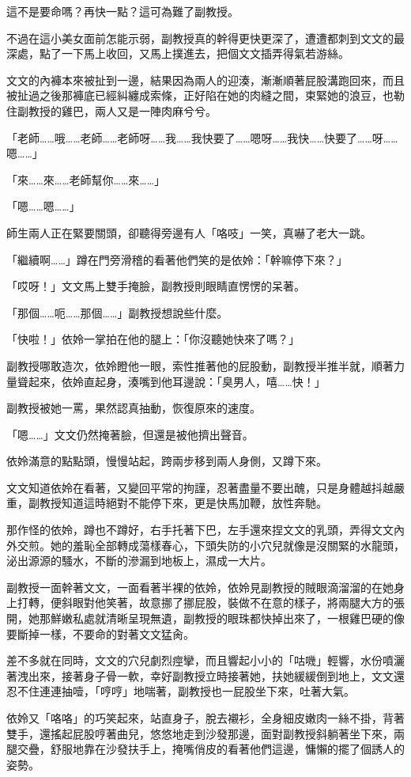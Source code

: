 這不是要命嗎？再快一點？這可為難了副教授。

不過在這小美女面前怎能示弱，副教授真的幹得更快更深了，遭遭都刺到文文的最深處，點了一下馬上收回，又馬上撲進去，把個文文插弄得氣若游絲。

文文的內褲本來被扯到一邊，結果因為兩人的迎湊，漸漸順著屁股溝跑回來，而且被扯過之後那褲底已經糾纏成索條，正好陷在她的肉縫之間，束緊她的浪豆，也勒住副教授的雞巴，兩人又是一陣肉麻兮兮。

「老師……哦……老師……老師呀……我……我快要了……嗯呀……我快……快要了……呀……嗯……」

「來……來……老師幫你……來……」

「嗯……嗯……」

師生兩人正在緊要關頭，卻聽得旁邊有人「咯吱」一笑，真嚇了老大一跳。

「繼續啊……」蹲在門旁滑稽的看著他們笑的是依姈：「幹嘛停下來？」

「哎呀！」文文馬上雙手掩臉，副教授則眼睛直愣愣的呆著。

「那個……呃……那個……」副教授想說些什麼。

「快啦！」依姈一掌拍在他的腿上：「你沒聽她快來了嗎？」

副教授哪敢造次，依姈瞪他一眼，索性推著他的屁股動，副教授半推半就，順著力量聳起來，依姈直起身，湊嘴到他耳邊說：「臭男人，嘻……快！」

副教授被她一罵，果然認真抽動，恢復原來的速度。

「嗯……」文文仍然掩著臉，但還是被他擠出聲音。

依姈滿意的點點頭，慢慢站起，跨兩步移到兩人身側，又蹲下來。

文文知道依姈在看著，又變回平常的拘謹，忍著盡量不要出醜，只是身體越抖越嚴重，副教授知道這時絕對不能停下來，更是快馬加鞭，放性奔馳。

那作怪的依姈，蹲也不蹲好，右手托著下巴，左手還來捏文文的乳頭，弄得文文內外交煎。她的羞恥全部轉成蕩樣春心，下頭失防的小穴兒就像是沒關緊的水龍頭，泌出源源的騷水，不斷的滲漏到地板上，濕成一大片。

副教授一面幹著文文，一面看著半裸的依姈，依姈見副教授的賊眼滴溜溜的在她身上打轉，便斜眼對他笑著，故意挪了挪屁股，裝做不在意的樣子，將兩腿大方的張開，她那鮮嫩私處就清晰呈現無遺，副教授的眼珠都快掉出來了，一根雞巴硬的像要斷掉一樣，不要命的對著文文猛肏。

差不多就在同時，文文的穴兒劇烈痙攣，而且響起小小的「咕嘰」輕響，水份噴灑著洩出來，接著身子骨一軟，幸好副教授立時接著她，扶她緩緩倒到地上，文文還忍不住連連抽噎，「哼哼」地喘著，副教授也一屁股坐下來，吐著大氣。

依姈又「咯咯」的巧笑起來，站直身子，脫去襯衫，全身細皮嫩肉一絲不掛，背著雙手，還搖起屁股哼著曲兒，悠悠地走到沙發那邊，面對副教授斜躺著坐下來，兩腿交疊，舒服地靠在沙發扶手上，掩嘴俏皮的看著他們這邊，慵懶的擺了個誘人的姿勢。

